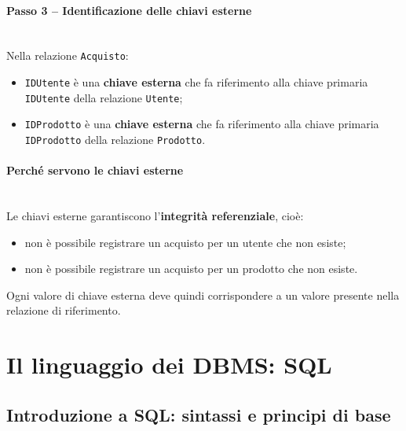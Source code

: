 \documentclass[a4paper,12pt]{article}
\begin{document}
\paragraph{Passo 3 -- Identificazione delle chiavi esterne}\mbox{}\\
Nella relazione \texttt{Acquisto}:
\begin{itemize}
    \item \texttt{IDUtente} è una \textbf{chiave esterna} che fa riferimento alla chiave primaria \texttt{IDUtente} della relazione \texttt{Utente};
    \item \texttt{IDProdotto} è una \textbf{chiave esterna} che fa riferimento alla chiave primaria \texttt{IDProdotto} della relazione \texttt{Prodotto}.
\end{itemize}

\bigskip
\paragraph{Perché servono le chiavi esterne}\mbox{}\\
Le chiavi esterne garantiscono l’\textbf{integrità referenziale}, cioè:
\begin{itemize}
    \item non è possibile registrare un acquisto per un utente che non esiste;
    \item non è possibile registrare un acquisto per un prodotto che non esiste.
\end{itemize}
Ogni valore di chiave esterna deve quindi corrispondere a un valore presente nella relazione di riferimento.















\newpage
\section{Il linguaggio dei DBMS: SQL}

\subsection{Introduzione a SQL: sintassi e principi di base}
\end{document}
